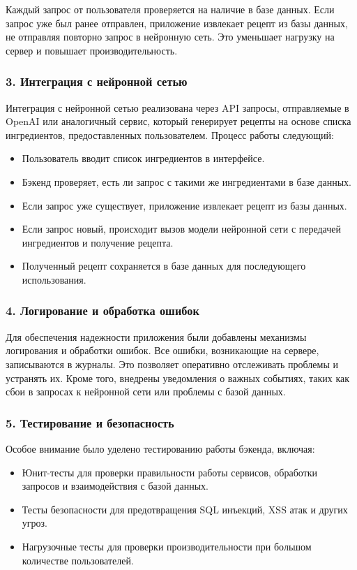 {Каждый запрос от пользователя проверяется на наличие в базе данных. Если запрос уже был ранее отправлен, приложение извлекает рецепт из базы данных, не отправляя повторно запрос в нейронную сеть. Это уменьшает нагрузку на сервер и повышает производительность.

\subsubsection*{3. Интеграция с нейронной сетью}
Интеграция с нейронной сетью реализована через API запросы, отправляемые в OpenAI или аналогичный сервис, который генерирует рецепты на основе списка ингредиентов, предоставленных пользователем. Процесс работы следующий:
\begin{itemize}
    \item Пользователь вводит список ингредиентов в интерфейсе.
    \item Бэкенд проверяет, есть ли запрос с такими же ингредиентами в базе данных.
    \item Если запрос уже существует, приложение извлекает рецепт из базы данных.
    \item Если запрос новый, происходит вызов модели нейронной сети с передачей ингредиентов и получение рецепта.
    \item Полученный рецепт сохраняется в базе данных для последующего использования.
\end{itemize}

\subsubsection*{4. Логирование и обработка ошибок}
Для обеспечения надежности приложения были добавлены механизмы логирования и обработки ошибок. Все ошибки, возникающие на сервере, записываются в журналы. Это позволяет оперативно отслеживать проблемы и устранять их. Кроме того, внедрены уведомления о важных событиях, таких как сбои в запросах к нейронной сети или проблемы с базой данных.

\subsubsection*{5. Тестирование и безопасность}
Особое внимание было уделено тестированию работы бэкенда, включая:
\begin{itemize}
    \item Юнит-тесты для проверки правильности работы сервисов, обработки запросов и взаимодействия с базой данных.
    \item Тесты безопасности для предотвращения SQL инъекций, XSS атак и других угроз.
    \item Нагрузочные тесты для проверки производительности при большом количестве пользователей.
\end{itemize}

}
